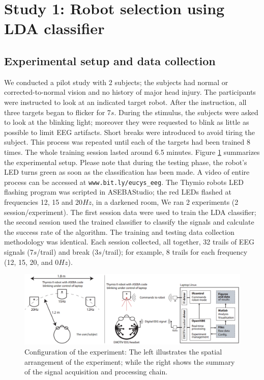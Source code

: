\documentclass{svmult}
\begin{document}
\section{Study 1: Robot selection using LDA classifier}
\label{sec:ML_approach}

\subsection{Experimental setup and data collection}
We conducted a pilot study with 2 subjects; the subjects had normal or corrected-to-normal vision and no history of major head injury. The participants were instructed to look at an indicated target robot. After the instruction, all three targets began to flicker for 7$s$. During the stimulus, the subjects were asked to look at the blinking light; moreover they were requested to blink as little as possible to limit EEG artifacts. Short breaks were introduced to avoid tiring the subject. This process was repeated until each of the targets had been trained 8 times. The whole training session lasted around 6.5 minutes. Figure \ref{fig:thymioinstall} summarizes the experimental setup. Please note that during the testing phase, the robot's LED turns green as soon as the classification has been made. A video of entire process can be accessed at \verb"www.bit.ly/eucys_eeg". The Thymio robots LED flashing program was scripted in ASEBAStudio; the red LEDs flashed at frequencies 12, 15 and 20$Hz$, in a darkened room, We ran 2 experiments (2 session/experiment). The first session data were used to train the LDA classifier; the second session used the trained classifier to classify the signals and calculate the success rate of the algorithm. The training and testing data collection methodology was identical. Each session collected, all together, 32 trails of EEG signals (7$s$/trail) and break (3$s$/trail); for example, 8 trails for each frequency (12, 15, 20, and 0$Hz$). 

\begin{figure}
\center
\includegraphics[width=\textwidth]{figures/Untitled.png}
\caption{Configuration of the experiment: The left illustrates the spatial arrangement of the experiment; while the right shows the summary of the signal acquisition and processing chain.} \label{fig:thymioinstall}
\end{figure}
\end{document}
